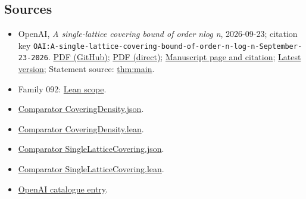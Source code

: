 \documentclass[11pt]{article}
\begin{document}
\subsection{Sources}
\begin{itemize}
\item OpenAI, \emph{A single-lattice covering bound of order nlog n}, 2026-09-23; citation key \texttt{OAI:A-single-lattice-covering-bound-of-order-n-log-n-September-23-2026}. \href{https://github.com/openai/math/blob/adc7f1241b42e322a6451854ab7e4b4c146bf78a/preprints/A-single-lattice-covering-bound-of-order-n-log-n-September-23-2026/paper.pdf}{PDF (GitHub)}; \href{https://github.com/openai/math/raw/adc7f1241b42e322a6451854ab7e4b4c146bf78a/preprints/A-single-lattice-covering-bound-of-order-n-log-n-September-23-2026/paper.pdf}{PDF (direct)}; \href{https://github.com/openai/math/blob/adc7f1241b42e322a6451854ab7e4b4c146bf78a/preprints/A-single-lattice-covering-bound-of-order-n-log-n-September-23-2026/README.md}{Manuscript page and citation}; \href{https://github.com/openai/math/blob/main/preprints/A-single-lattice-covering-bound-of-order-n-log-n-September-23-2026/paper.pdf}{Latest version}; Statement source: \href{https://github.com/openai/math/blob/adc7f1241b42e322a6451854ab7e4b4c146bf78a/preprints/A-single-lattice-covering-bound-of-order-n-log-n-September-23-2026/build/overview.tex\#L16}{thm:main}.
\item Family 092: \href{https://github.com/openai/math/blob/adc7f1241b42e322a6451854ab7e4b4c146bf78a/lean/docs/092.md}{Lean scope}.
\item \href{https://github.com/openai/math/blob/adc7f1241b42e322a6451854ab7e4b4c146bf78a/lean/ComparatorChallenges/CoveringDensity.json}{Comparator CoveringDensity.json}.
\item \href{https://github.com/openai/math/blob/adc7f1241b42e322a6451854ab7e4b4c146bf78a/lean/ComparatorChallenges/CoveringDensity.lean}{Comparator CoveringDensity.lean}.
\item \href{https://github.com/openai/math/blob/adc7f1241b42e322a6451854ab7e4b4c146bf78a/lean/ComparatorChallenges/SingleLatticeCovering.json}{Comparator SingleLatticeCovering.json}.
\item \href{https://github.com/openai/math/blob/adc7f1241b42e322a6451854ab7e4b4c146bf78a/lean/ComparatorChallenges/SingleLatticeCovering.lean}{Comparator SingleLatticeCovering.lean}.
\item \href{https://github.com/openai/math/blob/adc7f1241b42e322a6451854ab7e4b4c146bf78a/CONTENTS.md}{OpenAI catalogue entry}.
\end{itemize}
\end{document}
